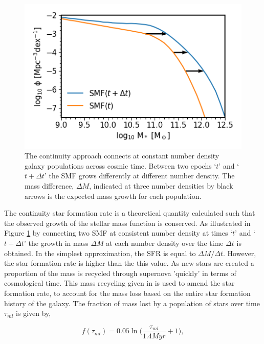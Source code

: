 \begin{figure}[h]
    \centering
    \includegraphics[width = \linewidth]{Figures/Chapter2/ContinuityEqn.png}
    \caption{The continuity approach connects at constant number density galaxy populations across cosmic time. Between two epochs `$t$' and `$t + \Delta t$' the SMF grows differently at different number density. The mass difference, $\Delta M$, indicated at three number densities by black arrows is the expected mass growth for each population.}
    \label{fig:Cont_Eqn}
\end{figure}

The continuity star formation rate is a theoretical quantity calculated such that the observed growth of the stellar mass function is conserved. As illustrated in Figure \ref{fig:Cont_Eqn} by connecting two SMF at consistent number density at times `$t$' and `$t + \Delta t$' the growth in mass $\Delta M$ at each number density over the time $\Delta t$ is obtained. In the simplest approximation, the SFR is equal to $\Delta M / \Delta t$. However, the star formation rate is higher than the this value. As new stars are created a proportion of the mass is recycled through supernova 'quickly' in terms of cosmological time. This mass recycling given in \citet{Moster2018Emerge10} is used to amend the star formation rate, to account for the mass loss based on the entire star formation history of the galaxy. The fraction of mass lost by a population of stars over time $\tau_{ml}$ is given by,

\begin{equation}
\label{eqn:f_ml}
f(\tau_{ml}) = 0.05 \ln \Big(\frac{\tau_{ml}}{1.4 Myr}+1\Big) ,
\end{equation}

